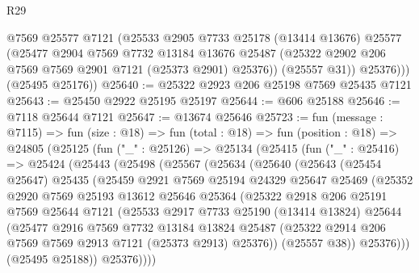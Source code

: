 \begin{lexlean}{R29}
\begin{coremodule}
            @7569
            @25577
            @7121
            (@25533
              @2905
              @7733
              @25178
              (@13414 @13676)
              @25577
              (@25477
                @2904
                @7569
                @7732
                @13184
                @13676
                @25487
                (@25322 @2902 @206 @7569 @7569 @2901 @7121 (@25373 @2901) @25376))
              (@25557 @31))
            @25376)))
      (@25495 @25176))
@25640 := @25322 @2923 @206 @25198 @7569 @25435 @7121
@25643 := @25450 @2922 @25195 @25197
@25644 := @606 @25188
@25646 := @7118 @25644 @7121
@25647 := @13674 @25646
@25723 := fun (message : @7115) =>
  fun (size : @18) =>
  fun (total : @18) =>
  fun (position : @18) =>
  @24805
    (@25125
      (fun ("_" : @25126) =>
      @25134
        (@25415
          (fun ("_" : @25416) =>
          @25424
            (@25443
              (@25498
                (@25567
                  (@25634
                    (@25640
                      (@25643
                        (@25454 @25647)
                        @25435
                        (@25459
                          @2921
                          @7569
                          @25194
                          @24329
                          @25647
                          @25469
                          (@25352
                            @2920
                            @7569
                            @25193
                            @13612
                            @25646
                            @25364
                            (@25322
                              @2918
                              @206
                              @25191
                              @7569
                              @25644
                              @7121
                              (@25533
                                @2917
                                @7733
                                @25190
                                (@13414 @13824)
                                @25644
                                (@25477
                                  @2916
                                  @7569
                                  @7732
                                  @13184
                                  @13824
                                  @25487
                                  (@25322 @2914 @206 @7569 @7569 @2913 @7121 (@25373 @2913) @25376))
                                (@25557 @38))
                              @25376)))
                        (@25495 @25188))
                      @25376))))

\end{coremodule}
\end{lexlean}
